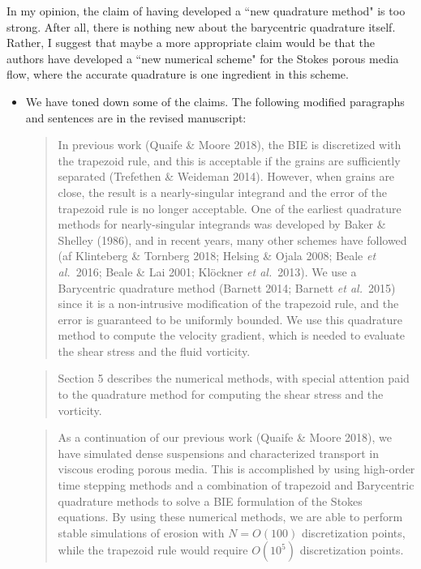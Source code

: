 \documentclass[11pt]{article}
\newcommand{\comment}[1]{{\color{blue} #1}}
\begin{document}
\noindent
\comment{In my opinion, the claim of having developed a ``new quadrature
method" is too strong. After all, there is nothing new about the
barycentric quadrature itself. Rather, I suggest that maybe a more
appropriate claim would be that the authors have developed a ``new
numerical scheme" for the Stokes porous media flow, where the accurate
quadrature is one ingredient in this scheme.}
\begin{itemize}
  \item We have toned down some of the claims. The following modified
    paragraphs and sentences are in the revised manuscript:
    \begin{quotation}
      \noindent
      In previous work (Quaife \& Moore 2018), the BIE is discretized
      with the trapezoid rule, and this is acceptable if the grains are
      sufficiently separated (Trefethen \& Weideman 2014). However, when
      grains are close, the result is a nearly-singular integrand and
      the error of the trapezoid rule is no longer acceptable. One of
      the earliest quadrature methods for nearly-singular integrands was
      developed by Baker \& Shelley (1986), and in recent years, many
      other schemes have followed (af Klinteberg \& Tornberg 2018;
      Helsing \& Ojala 2008; Beale {\em et al.}~2016; Beale \& Lai 2001;
      Kl\"{o}ckner {\em et al.}~2013). We use a Barycentric quadrature
      method (Barnett 2014; Barnett {\em et al.}~2015) since it is a
      non-intrusive modification of the trapezoid rule, and the error is
      guaranteed to be uniformly bounded. We use this quadrature method
      to compute the velocity gradient, which is needed to evaluate the
      shear stress and the fluid vorticity.
    \end{quotation}

    \begin{quotation}
      \noindent
      Section 5 describes the numerical methods, with special attention
      paid to the quadrature method for computing the shear stress and
      the vorticity.
    \end{quotation}

    \begin{quotation}
      \noindent
      As a continuation of our previous work (Quaife \& Moore 2018), we
      have simulated dense suspensions and characterized transport in
      viscous eroding porous media. This is accomplished by using
      high-order time stepping methods and a combination of trapezoid
      and Barycentric quadrature methods to solve a BIE formulation of
      the Stokes equations. By using these numerical methods, we are
      able to perform stable simulations of erosion with $N = O(100)$
      discretization points, while the trapezoid rule would require
      $O(10^5)$ discretization points.
    \end{quotation}
\end{itemize}
\end{document}
